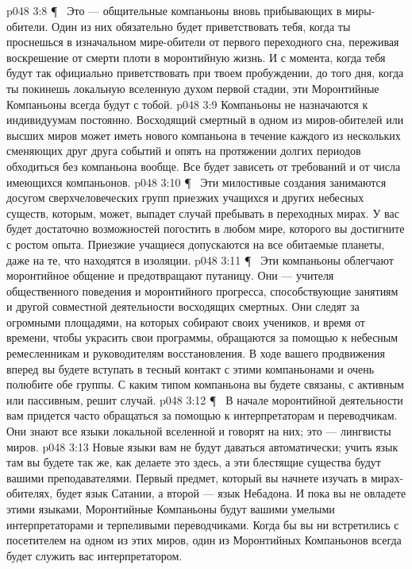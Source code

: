 \vs p048 3:8 \P\ \bibnobreakspace {} Это --- общительные компаньоны вновь прибывающих в миры\hyp{}обители. Один из них обязательно будет приветствовать тебя, когда ты проснешься в изначальном мире\hyp{}обители от первого переходного сна, переживая воскрешение от смерти плоти в моронтийную жизнь. И с момента, когда тебя будут так официально приветствовать при твоем пробуждении, до того дня, когда ты покинешь локальную вселенную духом первой стадии, эти Моронтийные Компаньоны всегда будут с тобой.
\vs p048 3:9 Компаньоны не назначаются к индивидуумам постоянно. Восходящий смертный в одном из миров\hyp{}обителей или высших миров может иметь нового компаньона в течение каждого из нескольких сменяющих друг друга событий и опять на протяжении долгих периодов обходиться без компаньона вообще. Все будет зависеть от требований и от числа имеющихся компаньонов.
\vs p048 3:10 \P\ \bibnobreakspace {} Эти милостивые создания занимаются досугом сверхчеловеческих групп приезжих учащихся и других небесных существ, которым, может, выпадет случай пребывать в переходных мирах. У вас будет достаточно возможностей погостить в любом мире, которого вы достигните с ростом опыта. Приезжие учащиеся допускаются на все обитаемые планеты, даже на те, что находятся в изоляции.
\vs p048 3:11 \P\ \bibnobreakspace {} Эти компаньоны облегчают моронтийное общение и предотвращают путаницу. Они --- учителя общественного поведения и моронтийного прогресса, способствующие занятиям и другой совместной деятельности восходящих смертных. Они следят за огромными площадями, на которых собирают своих учеников, и время от времени, чтобы украсить свои программы, обращаются за помощью к небесным ремесленникам и руководителям восстановления. В ходе вашего продвижения вперед вы будете вступать в тесный контакт с этими компаньонами и очень полюбите обе группы. С каким типом компаньона вы будете связаны, с активным или пассивным, решит случай.
\vs p048 3:12 \P\ \bibnobreakspace {} В начале моронтийной деятельности вам придется часто обращаться за помощью к интерпретаторам и переводчикам. Они знают все языки локальной вселенной и говорят на них; это --- лингвисты миров.
\vs p048 3:13 Новые языки вам не будут даваться автоматически; учить язык там вы будете так же, как делаете это здесь, а эти блестящие существа будут вашими преподавателями. Первый предмет, который вы начнете изучать в мирах\hyp{}обителях, будет язык Сатании, а второй --- язык Небадона. И пока вы не овладете этими языками, Моронтийные Компаньоны будут вашими умелыми интерпретаторами и терпеливыми переводчиками. Когда бы вы ни встретились с посетителем на одном из этих миров, один из Моронтийных Компаньонов всегда будет служить вас интерпретатором.
